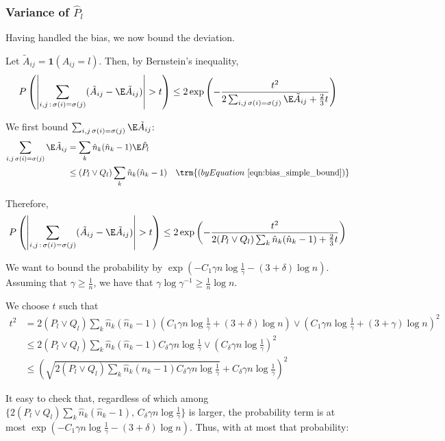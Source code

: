 \documentclass{article}
\begin{document}
\subsubsection{Variance of $\hat{P}_l$}

Having handled the bias, we now bound the deviation.

Let $ \tilde{A}_{ij} = \mathbf{1}(A_{ij} = l)$. Then, by Bernstein's inequality,
\[
P\left( \left| \sum_{i,j\,:\, \sigma(i) = \sigma(j)} (\tilde{A}_{ij} - \E \tilde{A}_{ij} ) \right|  > t 
 \right) \leq 2 \exp\left( 
    - \frac{t^2}{ 2 \sum_{i,j \, \sigma(i) = \sigma(j)} \E \tilde{A}_{ij}  + \frac{2}{3}t } 
\right)
\]

We first bound $\sum_{i,j \, \sigma(i) = \sigma(j)} \E \tilde{A}_{ij}$:
\begin{align*}
\sum_{i,j \, \sigma(i) = \sigma(j)} \E \tilde{A}_{ij} &=
  \sum_k \hat{n}_k (\hat{n}_k - 1) \E \hat{P}_l \\
 &\leq (P_l \vee Q_l) \sum_k \hat{n}_k (\hat{n}_k - 1) \quad 
  \trm{(by Equation~\ref{eqn:bias_simple_bound})}
\end{align*}

Therefore,
\[
P\left( \left| \sum_{i,j\,:\, \sigma(i) = \sigma(j)} (\tilde{A}_{ij} - \E \tilde{A}_{ij} ) \right|  > t 
 \right) \leq 2 \exp\left( 
    - \frac{t^2}{ 2 (P_l \vee Q_l) \sum_k \hat{n}_k (\hat{n}_k - 1)  + \frac{2}{3}t } 
\right)
\]

We want to bound the probability by $\exp( - C_1 \gamma n \log \frac{1}{\gamma} - (3+\delta) \log n )$. Assuming that $\gamma \geq \frac{1}{n}$, we have that $\gamma \log \gamma^{-1} \geq \frac{1}{n} \log n$. 

We choose $t$ such that
\begin{align*}
t^2 &= 2 (P_l \vee Q_l) \sum_k \hat{n}_k (\hat{n}_k - 1) \left( 
    C_1 \gamma n \log \frac{1}{\gamma} + (3+\delta) \log n \right) \vee 
   \left( C_1 \gamma n \log \frac{1}{\gamma} + (3 + \gamma) \log n \right)^2  \\
 &\leq 2 (P_l \vee Q_l) \sum_k \hat{n}_k (\hat{n}_k - 1) C_{\delta} \gamma n \log \frac{1}{\gamma} \vee \left( C_\delta \gamma n \log \frac{1}{\gamma} \right)^2  \\
 &\leq \left( \sqrt{  2 (P_l \vee Q_l)  \sum_k \hat{n}_k (\hat{n}_k - 1) C_\delta \gamma n \log \frac{1}{\gamma} } + C_\delta \gamma n \log \frac{1}{\gamma} \right)^2
\end{align*}

It easy to check that, regardless of which among $\{ 2 (P_l \vee Q_l) \sum_k \hat{n}_k (\hat{n}_k - 1) ,\, C_\delta \gamma n \log \frac{1}{\gamma} \}$ is larger, the probability term is at most $\exp( - C_1 \gamma n \log \frac{1}{\gamma} - (3+\delta) \log n )$. Thus, with at most that probability:
\end{document}
